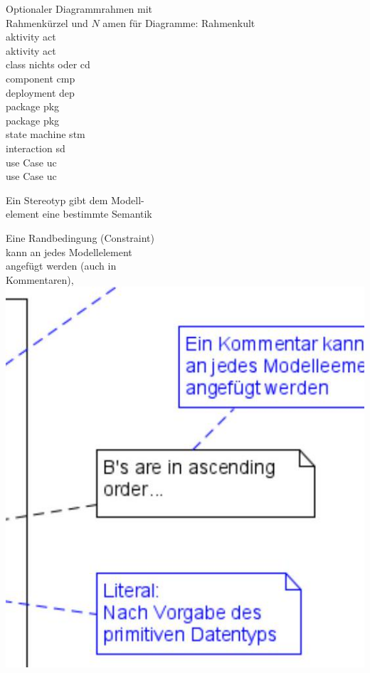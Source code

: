 \documentclass[10pt]{article}
\begin{document}
Optionaler Diagrammrahmen mit\\
Rahmenkürzel und $N$ amen für Diagramme: Rahmenkult\\
aktivity act\\
aktivity act\\
class nichts oder cd\\
component cmp\\
deployment dep\\
package pkg\\
package pkg\\
state machine stm\\
interaction sd\\
use Case uc\\
use Case uc

Ein Stereotyp gibt dem Modell-\\
element eine bestimmte Semantik

Eine Randbedingung (Constraint)\\
kann an jedes Modellelement\\
angefügt werden (auch in\\
Kommentaren),\\
\includegraphics[width=\linewidth]{images/2025_01_02_787afb9584031d2940deg-12}
\end{document}
